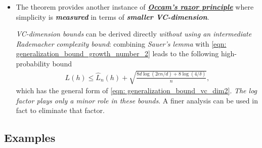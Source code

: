 \documentclass[11pt]{article}
\begin{document}
\begin{itemize}
\item \begin{remark}
The theorem provides another instance of \underline{\emph{\textbf{Occam's razor principle}}} where simplicity is \emph{\textbf{measured}} in terms of \emph{\textbf{smaller VC-dimension}}.

\emph{VC-dimension bounds} can be derived directly \emph{without using an intermediate Rademacher complexity bound}: combining \emph{Sauer’s lemma} with \eqref{eqn: generalization_bound_growth_number_2} leads to the following high-probability bound
\begin{align}
L(h) \le \widehat{L}_{n}(h) + \sqrt{\frac{8d\log(2en /d) + 8\log(4/\delta)}{n}},  \label{eqn: generalization_bound_vc_dim3}
\end{align}
which has the general form of \eqref{eqn: generalization_bound_vc_dim2}. \emph{The log factor plays only a minor role in these bounds}. A finer analysis can be used in fact to eliminate that factor.
\end{remark}

\end{itemize}

\subsection{Examples}
\end{document}

